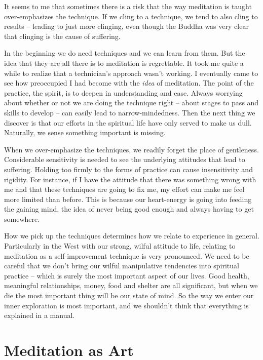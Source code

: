 It seems to me that sometimes there is a risk that the way meditation is
taught over-emphasizes the technique. If we cling to a technique, we
tend to also cling to results – leading to just more clinging, even
though the Buddha was very clear that clinging is the cause of
suffering.

In the beginning we do need techniques and we can learn from them. But
the idea that they are all there is to meditation is regrettable. It
took me quite a while to realize that a technician’s approach wasn’t
working. I eventually came to see how preoccupied I had become with the
\emph{idea} of meditation. The point of the practice, the spirit, is to
deepen in understanding and ease. Always worrying about whether or not
we are doing the technique right – about stages to pass and skills to
develop – can easily lead to narrow-mindedness. Then the next thing we
discover is that our efforts in the spiritual life have only served to
make us dull. Naturally, we sense something important is missing.

When we over-emphasize the techniques, we readily forget the place of
gentleness. Considerable sensitivity is needed to see the underlying
attitudes that lead to suffering. Holding too firmly to the forms of
practice can cause insensitivity and rigidity. For instance, if I have
the attitude that there was something wrong with me and that these
techniques are going to fix me, my effort can make me feel more limited
than before. This is because our heart-energy is going into feeding the
gaining mind, the idea of never being good enough and always having to
get somewhere.

How we pick up the techniques determines how we relate to experience in
general. Particularly in the West with our strong, wilful attitude to
life, relating to meditation as a self-improvement technique is very
pronounced. We need to be careful that we don’t bring our wilful
manipulative tendencies into spiritual practice – which is surely the
most important aspect of our lives. Good health, meaningful
relationships, money, food and shelter are all significant, but when we
die the most important thing will be our state of mind. So the way we
enter our inner exploration is most important, and we shouldn’t think
that everything is explained in a manual.

\section{Meditation as Art}

